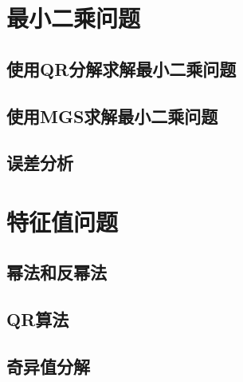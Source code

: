 \documentclass[a4paper,10pt]{ctexart}
\begin{document}
\section{最小二乘问题}

\subsection{使用QR分解求解最小二乘问题}

\subsection{使用MGS求解最小二乘问题}

\subsection{误差分析}

\section{特征值问题}

\subsection{幂法和反幂法}

\subsection{QR算法}

\subsection{奇异值分解}


\end{document}
